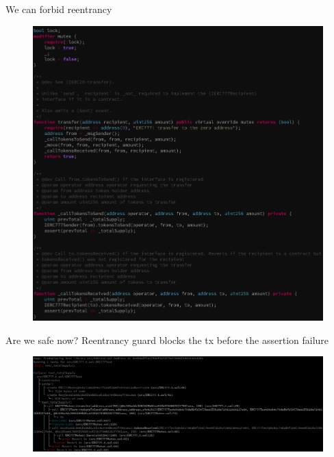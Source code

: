 \documentclass[aspectratio=169,10pt]{beamer}
\begin{document}
\begin{frame}[fragile]
\begin{center}
We can forbid reentrancy
\begin{figure}
	\includegraphics[scale=0.23]{images/erc777_pass_mutex_smtchecker}
\end{figure}
\end{center}
\end{frame}

\begin{frame}[fragile]
\begin{center}
Are we safe now? Reentrancy guard blocks the tx before the assertion failure
\begin{figure}
	\includegraphics[scale=0.2]{images/erc777_fail_hevm_test_mutex}
\end{figure}
\end{center}
\end{frame}
\end{document}
